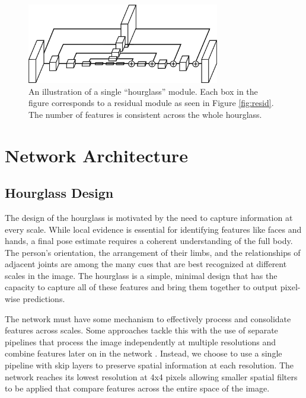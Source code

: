 \documentclass[runningheads]{llncs}
\begin{document}
\begin{figure}[t]
\centering
\includegraphics[width=0.75\textwidth]{img/single-hourglass}
\caption{An illustration of a single ``hourglass'' module. Each box in
  the figure corresponds to a residual module as seen in Figure
  \ref{fig:resid}. The number of features is consistent across the
  whole hourglass.}
\label{fig:single-hg}
\end{figure}

\section{Network Architecture}

\subsection{Hourglass Design}

The design of the hourglass is motivated by the need to capture
information at every scale. While local evidence is essential for
identifying features like faces and hands, a final pose estimate
requires a coherent understanding of the full body. The person's
orientation, the arrangement of their limbs, and the relationships of
adjacent joints are among the many cues that are best recognized at
different scales in the image. The hourglass is a simple, minimal
design that has the capacity to capture all of these features and
bring them together to output pixel-wise predictions.

The network must have some mechanism to effectively process and
consolidate features across scales. Some approaches tackle this with
the use of separate pipelines that process the image independently at
multiple resolutions and combine features later on in the network
\cite{tompson2014joint, wei2016machines}. Instead, we choose to use a
single pipeline with skip layers to preserve spatial information at
each resolution. The network reaches its lowest resolution at 4x4
pixels allowing smaller spatial filters to be applied that compare
features across the entire space of the image.
\end{document}
